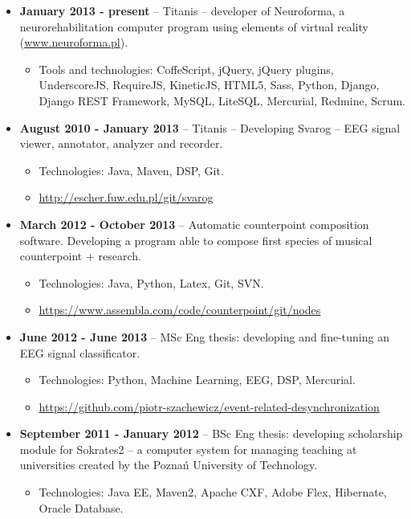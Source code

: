 \documentclass[10pt]{article}
\newenvironment{outerlist}[1][\enskip\textbullet]%
        {\begin{itemize}[#1]}{\end{itemize}%
         \vspace{-.6\baselineskip}}
\begin{document}
\begin{outerlist}

\item[] \textbf{January 2013 - present} -- Titanis -- developer of Neuroforma, a neurorehabilitation computer program using elements of virtual reality (\url{www.neuroforma.pl}). 
\begin{itemize}
	\item Tools and technologies: CoffeScript, jQuery, jQuery plugins, UnderscoreJS, RequireJS, KineticJS, HTML5, Sass, Python, Django, Django REST Framework, MySQL, LiteSQL, Mercurial, Redmine, Scrum.
\end{itemize}

\item[] \textbf{August 2010 - January 2013} -- Titanis -- Developing Svarog -- EEG signal viewer, annotator, analyzer and recorder.
\begin{itemize}
	\item Technologies: Java, Maven, DSP, Git.
	\item \url{http://escher.fuw.edu.pl/git/svarog}
\end{itemize}

\item[] \textbf{March 2012 - October 2013} -- Automatic counterpoint composition software. 
Developing a program able to compose first species of musical counterpoint + research.
\begin{itemize}
	\item Technologies: Java, Python, Latex, Git, SVN. 
	\item \url{https://www.assembla.com/code/counterpoint/git/nodes}
\end{itemize}

\item[] \textbf{June 2012 - June 2013} -- MSc Eng thesis: developing and fine-tuning an EEG signal classificator.
\begin{itemize}
	\item Technologies: Python, Machine Learning, EEG, DSP, Mercurial.
	\item \url{https://github.com/piotr-szachewicz/event-related-desynchronization}
\end{itemize}

\pagebreak

\item[] \textbf{September 2011 - January 2012} -- BSc Eng thesis: developing scholarship module for Sokrates2 -- a computer
system for managing teaching at universities created by the Poznań University of Technology.
\begin{itemize}
	\item Technologies: Java EE, Maven2, Apache CXF, Adobe Flex, Hibernate, Oracle Database.
\end{itemize}


\end{outerlist}
\end{document}
